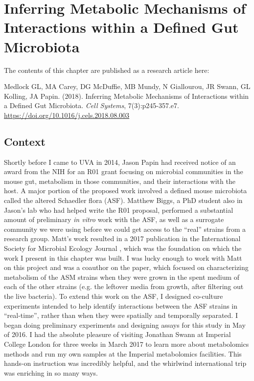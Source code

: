 \documentclass[11pt,twocolumn,notitlepage,openany,twoside]{book}
\begin{document}
\chapter{Inferring Metabolic Mechanisms of Interactions within a Defined Gut Microbiota}

\begin{refsection}

The contents of this chapter are published as a research article here:

\medskip\noindent
Medlock GL, MA Carey, DG McDuffie, MB Mundy, N Giallourou, JR Swann, GL Kolling, JA Papin. (2018). Inferring Metabolic Mechanisms of Interactions within a Defined Gut Microbiota. \textit{Cell Systems}, 7(3):p245-357.e7. \url{https://doi.org/10.1016/j.cels.2018.08.003}

\section{Context}

Shortly before I came to UVA in 2014, Jason Papin had received notice of an award from the NIH for an R01 grant focusing on microbial communities in the mouse gut, metabolism in those communities, and their interactions with the host. A major portion of the proposed work involved a defined mouse microbiota called the altered Schaedler flora (ASF). Matthew Biggs, a PhD student also in Jason's lab who had helped write the R01 proposal, performed a substantial amount of preliminary \textit{in vitro} work with the ASF, as well as a surrogate community we were using before we could get access to the ``real'' strains from a research group. Matt's work resulted in a 2017 publication in the International Society for Microbial Ecology Journal \cite{Biggs2017-fs}, which was the foundation on which the work I present in this chapter was built. I was lucky enough to work with Matt on this project and was a coauthor on the paper, which focused on characterizing metabolism of the ASM strains when they were grown in the spent medium of each of the other strains (e.g. the leftover media from growth, after filtering out the live bacteria). To extend this work on the ASF, I designed co-culture experiments intended to help identify interactions between the ASF strains in ``real-time'', rather than when they were spatially and temporally separated. I began doing preliminary experiments and designing assays for this study in May of 2016. I had the absolute pleasure of visiting Jonathan Swann at Imperial College London for three weeks in March 2017 to learn more about metabolomics methods and run my own samples at the Imperial metabolomics facilities. This hands-on instruction was incredibly helpful, and the whirlwind international trip was enriching in so many ways.


\end{refsection}
\end{document}
